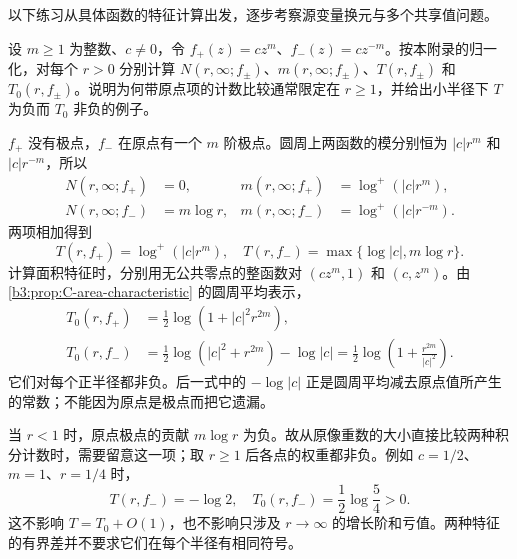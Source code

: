 以下练习从具体函数的特征计算出发，逐步考察源变量换元与多个共享值问题。

\begin{exercise}\label{b3:ex:C-1}
设 \(m\ge1\) 为整数、\(c\ne0\)，令 \(f_+(z)=cz^m\)、\(f_-(z)=cz^{-m}\)。按本附录的归一化，对每个 \(r>0\) 分别计算 \(N(r,\infty;f_\pm)\)、\(m(r,\infty;f_\pm)\)、\(T(r,f_\pm)\) 和 \(T_0(r,f_\pm)\)。说明为何带原点项的计数比较通常限定在 \(r\ge1\)，并给出小半径下 \(T\) 为负而 \(T_0\) 非负的例子。
\end{exercise}
\begin{solution}
\(f_+\) 没有极点，\(f_-\) 在原点有一个 \(m\) 阶极点。圆周上两函数的模分别恒为 \(|c|r^m\) 和 \(|c|r^{-m}\)，所以
\[
 \begin{aligned}
 N(r,\infty;f_+)&=0,
 &m(r,\infty;f_+)&=\log^+(|c|r^m),\\
 N(r,\infty;f_-)&=m\log r,
 &m(r,\infty;f_-)&=\log^+(|c|r^{-m}).
 \end{aligned}
\]
两项相加得到
\[
 T(r,f_+)=\log^+(|c|r^m),
 \quad T(r,f_-)=\max\{\log|c|,m\log r\}.
\]
计算面积特征时，分别用无公共零点的整函数对 \((cz^m,1)\) 和 \((c,z^m)\)。由 \cref{b3:prop:C-area-characteristic} 的圆周平均表示，
\[
 \begin{aligned}
 T_0(r,f_+)&=\frac12\log(1+|c|^2r^{2m}),\\
 T_0(r,f_-)&=\frac12\log(|c|^2+r^{2m})-\log|c|
            =\frac12\log\left(1+\frac{r^{2m}}{|c|^2}\right).
 \end{aligned}
\]
它们对每个正半径都非负。后一式中的 \(-\log|c|\) 正是圆周平均减去原点值所产生的常数；不能因为原点是极点而把它遗漏。

当 \(r<1\) 时，原点极点的贡献 \(m\log r\) 为负。故从原像重数的大小直接比较两种积分计数时，需要留意这一项；取 \(r\ge1\) 后各点的权重都非负。例如 \(c=1/2\)、\(m=1\)、\(r=1/4\) 时，
\[
 T(r,f_-)=-\log2,
 \quad T_0(r,f_-)=\frac12\log\frac54>0.
\]
这不影响 \(T=T_0+O(1)\)，也不影响只涉及 \(r\to\infty\) 的增长阶和亏值。两种特征的有界差并不要求它们在每个半径有相同符号。
\end{solution}

